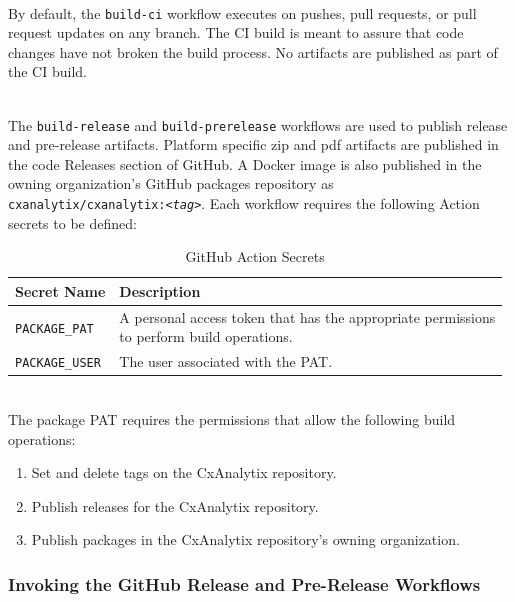 \noindent\\By default, the \texttt{build-ci} workflow executes on pushes, pull requests, or pull request updates on any branch.  The CI build is meant to
assure that code changes have not broken the build process.  No artifacts are published as part of the CI build.

\noindent\\The \texttt{build-release} and \texttt{build-prerelease} workflows are used to publish release and pre-release artifacts.  Platform specific zip and pdf 
artifacts are published in the code Releases section of GitHub.  A Docker image is also published in the owning organization's GitHub packages repository as 
\\\texttt{cxanalytix/cxanalytix:\textit{<tag>}}.  Each workflow requires the following Action secrets to be defined:

\begin{table}[h]
    \caption{GitHub Action Secrets}        
    \begin{tabularx}{\textwidth}{ll}
        \toprule
        \textbf{Secret Name} & \textbf{Description} \\
        \midrule
        \texttt{PACKAGE\_PAT} & \makecell[l]{A personal access token that has the appropriate permissions\\to perform build operations.} \\
        \midrule
        \texttt{PACKAGE\_USER} & The user associated with the PAT. \\
        \bottomrule
    \end{tabularx}
\end{table}

\noindent\\The package PAT requires the permissions that allow the following build operations:\\

\begin{enumerate}
    \item Set and delete tags on the CxAnalytix repository.
    \item Publish releases for the CxAnalytix repository.
    \item Publish packages in the CxAnalytix repository's owning organization.
\end{enumerate}

\subsubsection{Invoking the GitHub Release and Pre-Release Workflows}

